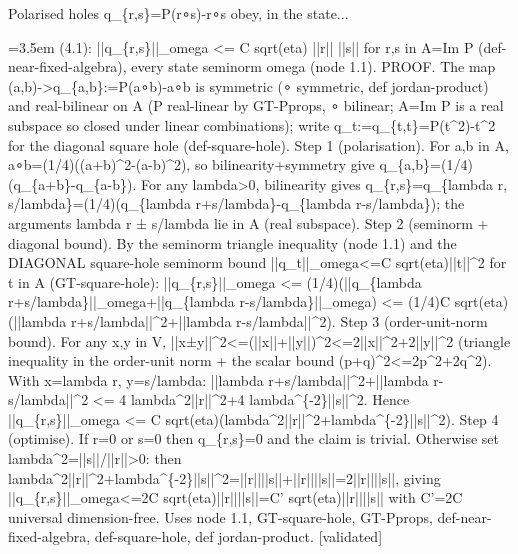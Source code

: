 \documentclass{article}
\newcommand{\step}[1]{\par\noindent\hangindent=3.5em\hangafter=1%
  \makebox[3.5em][l]{\textbf{#1.}}}
\newcommand{\steptag}[1]{\hfill{\small\textsf{[#1]}}}
\begin{document}
\begin{proofbox}{Polarised holes q\_\{r,s\}=P(r∘s)-r∘s obey, in the state...}
\step{1.2} (4.1): ||q\_\{r,s\}||\_omega <= C sqrt(eta) ||r|| ||s|| for r,s in A=Im P (def-near-fixed-algebra), every state seminorm omega (node 1.1). PROOF. The map (a,b)->q\_\{a,b\}:=P(a∘b)-a∘b is symmetric (∘ symmetric, def jordan-product) and real-bilinear on A (P real-linear by GT-Pprops, ∘ bilinear; A=Im P is a real subspace so closed under linear combinations); write q\_t:=q\_\{t,t\}=P(t\textasciicircum{}2)-t\textasciicircum{}2 for the diagonal square hole (def-square-hole). Step 1 (polarisation). For a,b in A, a∘b=(1/4)((a+b)\textasciicircum{}2-(a-b)\textasciicircum{}2), so bilinearity+symmetry give q\_\{a,b\}=(1/4)(q\_\{a+b\}-q\_\{a-b\}). For any lambda>0, bilinearity gives q\_\{r,s\}=q\_\{lambda r, s/lambda\}=(1/4)(q\_\{lambda r+s/lambda\}-q\_\{lambda r-s/lambda\}); the arguments lambda r ± s/lambda lie in A (real subspace). Step 2 (seminorm + diagonal bound). By the seminorm triangle inequality (node 1.1) and the DIAGONAL square-hole seminorm bound ||q\_t||\_omega<=C sqrt(eta)||t||\textasciicircum{}2 for t in A (GT-square-hole): ||q\_\{r,s\}||\_omega <= (1/4)(||q\_\{lambda r+s/lambda\}||\_omega+||q\_\{lambda r-s/lambda\}||\_omega) <= (1/4)C sqrt(eta)(||lambda r+s/lambda||\textasciicircum{}2+||lambda r-s/lambda||\textasciicircum{}2). Step 3 (order-unit-norm bound). For any x,y in V, ||x±y||\textasciicircum{}2<=(||x||+||y||)\textasciicircum{}2<=2||x||\textasciicircum{}2+2||y||\textasciicircum{}2 (triangle inequality in the order-unit norm + the scalar bound (p+q)\textasciicircum{}2<=2p\textasciicircum{}2+2q\textasciicircum{}2). With x=lambda r, y=s/lambda: ||lambda r+s/lambda||\textasciicircum{}2+||lambda r-s/lambda||\textasciicircum{}2 <= 4 lambda\textasciicircum{}2||r||\textasciicircum{}2+4 lambda\textasciicircum{}\{-2\}||s||\textasciicircum{}2. Hence ||q\_\{r,s\}||\_omega <= C sqrt(eta)(lambda\textasciicircum{}2||r||\textasciicircum{}2+lambda\textasciicircum{}\{-2\}||s||\textasciicircum{}2). Step 4 (optimise). If r=0 or s=0 then q\_\{r,s\}=0 and the claim is trivial. Otherwise set lambda\textasciicircum{}2=||s||/||r||>0: then lambda\textasciicircum{}2||r||\textasciicircum{}2+lambda\textasciicircum{}\{-2\}||s||\textasciicircum{}2=||r||||s||+||r||||s||=2||r||||s||, giving ||q\_\{r,s\}||\_omega<=2C sqrt(eta)||r||||s||=C' sqrt(eta)||r||||s|| with C'=2C universal dimension-free. Uses node 1.1, GT-square-hole, GT-Pprops, def-near-fixed-algebra, def-square-hole, def jordan-product. \steptag{validated} \\[4pt]

\end{proofbox}
\end{document}
